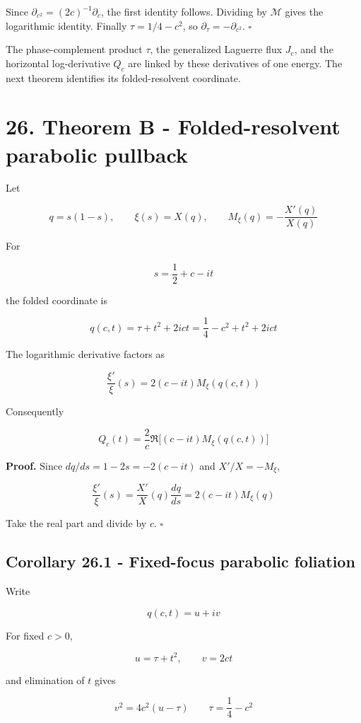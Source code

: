 \documentclass[
  11pt,
]{book}
\begin{document}
Since \(\partial_{c^2}=(2c)^{-1}\partial_c\), the first identity
follows. Dividing by \(\mathcal M\) gives the logarithmic identity.
Finally \(\tau=1/4-c^2\), so \(\partial_\tau=-\partial_{c^2}\).
\(\square\)

The phase-complement product \(\tau\), the generalized Laguerre flux
\(J_c\), and the horizontal log-derivative \(Q_c\) are linked by these
derivatives of one energy. The next theorem identifies its
folded-resolvent coordinate.

\section{26. Theorem B - Folded-resolvent parabolic
pullback}\label{theorem-b---folded-resolvent-parabolic-pullback}

Let

\[
q=s(1-s),\qquad \xi(s)=X(q),\qquad
M_\xi(q)=-\frac{X'(q)}{X(q)}
\]

For

\[
s=\frac12+c-it
\]

the folded coordinate is

\[
\boxed{
q(c,t)=\tau+t^2+2ict
=\frac14-c^2+t^2+2ict
}
\]

The logarithmic derivative factors as

\[
\boxed{
\frac{\xi'}{\xi}(s)=2(c-it)M_\xi(q(c,t))
}
\]

Consequently

\[
\boxed{
Q_c(t)=\frac2c
\Re\bigl[(c-it)M_\xi(q(c,t))\bigr]
}
\]

\textbf{Proof.} Since \(dq/ds=1-2s=-2(c-it)\) and \(X'/X=-M_\xi\),

\[
\frac{\xi'}{\xi}(s)
=\frac{X'}X(q)\frac{dq}{ds}
=2(c-it)M_\xi(q)
\]

Take the real part and divide by \(c\). \(\square\)

\subsection{Corollary 26.1 - Fixed-focus parabolic
foliation}\label{corollary-26.1---fixed-focus-parabolic-foliation}

Write

\[
q(c,t)=u+iv
\]

For fixed \(c>0\),

\[
u=\tau+t^2,\qquad v=2ct
\]

and elimination of \(t\) gives

\[
\boxed{
v^2=4c^2(u-\tau)
\qquad
\tau=\frac14-c^2
}
\]
\end{document}
